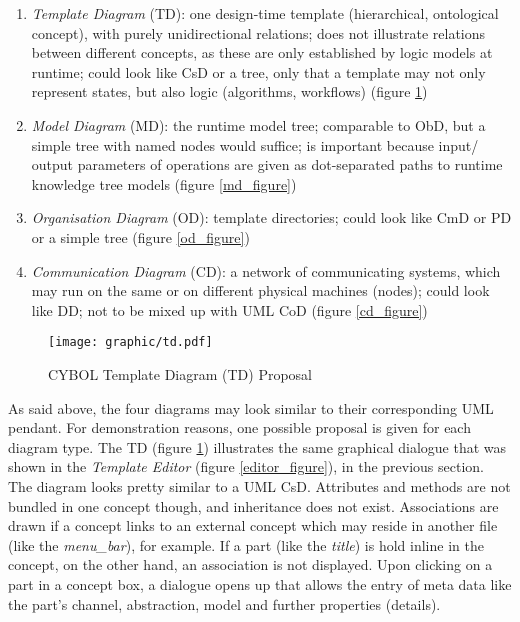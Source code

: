 \begin{enumerate}
    \item \emph{Template Diagram} (TD): one design-time template (hierarchical,
        ontological concept), with purely unidirectional relations; does not
        illustrate relations between different concepts, as these are only
        established by logic models at runtime; could look like CsD or a tree,
        only that a template may not only represent states, but also logic
        (algorithms, workflows) (figure \ref{td_figure})
    \item \emph{Model Diagram} (MD): the runtime model tree; comparable to ObD,
        but a simple tree with named nodes would suffice; is important because
        input/ output parameters of operations are given as dot-separated paths
        to runtime knowledge tree models (figure \ref{md_figure})
    \item \emph{Organisation Diagram} (OD): template directories; could look
        like CmD or PD or a simple tree (figure \ref{od_figure})
    \item \emph{Communication Diagram} (CD): a network of communicating
        systems, which may run on the same or on different physical machines
        (nodes); could look like DD; not to be mixed up with UML CoD (figure
        \ref{cd_figure})
\end{enumerate}

\begin{figure}[ht]
    \begin{center}
        \texttt{[image: graphic/td.pdf]}
        \caption{CYBOL Template Diagram (TD) Proposal}
        \label{td_figure}
    \end{center}
\end{figure}

As said above, the four diagrams may look similar to their corresponding UML
pendant. For demonstration reasons, one possible proposal is given for each
diagram type. The TD (figure \ref{td_figure}) illustrates the same graphical
dialogue that was shown in the \emph{Template Editor} (figure
\ref{editor_figure}), in the previous section. The diagram looks pretty similar
to a UML CsD. Attributes and methods are not bundled in one concept though, and
inheritance does not exist. Associations are drawn if a concept links to an
external concept which may reside in another file (like the \emph{menu\_bar}),
for example. If a part (like the \emph{title}) is hold inline in the concept,
on the other hand, an association is not displayed. Upon clicking on a part in
a concept box, a dialogue opens up that allows the entry of meta data like the
part's channel, abstraction, model and further properties (details).

